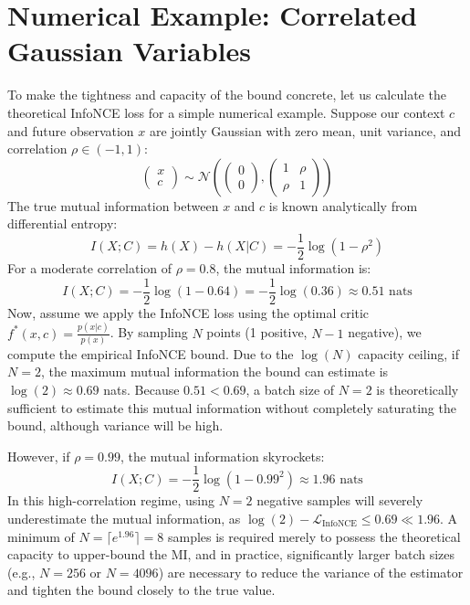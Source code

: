 \section{Numerical Example: Correlated Gaussian Variables}

To make the tightness and capacity of the bound concrete, let us calculate the theoretical InfoNCE loss for a simple numerical example. Suppose our context $c$ and future observation $x$ are jointly Gaussian with zero mean, unit variance, and correlation $\rho \in (-1, 1)$:
\begin{equation}
    \begin{pmatrix} x \\ c \end{pmatrix} \sim \mathcal{N} \left( \begin{pmatrix} 0 \\ 0 \end{pmatrix}, \begin{pmatrix} 1 & \rho \\ \rho & 1 \end{pmatrix} \right)
\end{equation}
The true mutual information between $x$ and $c$ is known analytically from differential entropy:
\begin{equation}
    I(X; C) = h(X) - h(X|C) = -\frac{1}{2} \log(1 - \rho^2)
\end{equation}
For a moderate correlation of $\rho = 0.8$, the mutual information is:
\begin{equation}
    I(X; C) = -\frac{1}{2} \log(1 - 0.64) = -\frac{1}{2} \log(0.36) \approx 0.51 \text{ nats}
\end{equation}
Now, assume we apply the InfoNCE loss using the optimal critic $f^*(x, c) = \frac{p(x|c)}{p(x)}$. By sampling $N$ points (1 positive, $N-1$ negative), we compute the empirical InfoNCE bound. Due to the $\log(N)$ capacity ceiling, if $N=2$, the maximum mutual information the bound can estimate is $\log(2) \approx 0.69$ nats. Because $0.51 < 0.69$, a batch size of $N=2$ is theoretically sufficient to estimate this mutual information without completely saturating the bound, although variance will be high. 

However, if $\rho = 0.99$, the mutual information skyrockets:
\begin{equation}
    I(X; C) = -\frac{1}{2} \log(1 - 0.99^2) \approx 1.96 \text{ nats}
\end{equation}
In this high-correlation regime, using $N=2$ negative samples will severely underestimate the mutual information, as $\log(2) - \mathcal{L}_{\text{InfoNCE}} \le 0.69 \ll 1.96$. A minimum of $N = \lceil e^{1.96} \rceil = 8$ samples is required merely to possess the theoretical capacity to upper-bound the MI, and in practice, significantly larger batch sizes (e.g., $N=256$ or $N=4096$) are necessary to reduce the variance of the estimator and tighten the bound closely to the true value.

